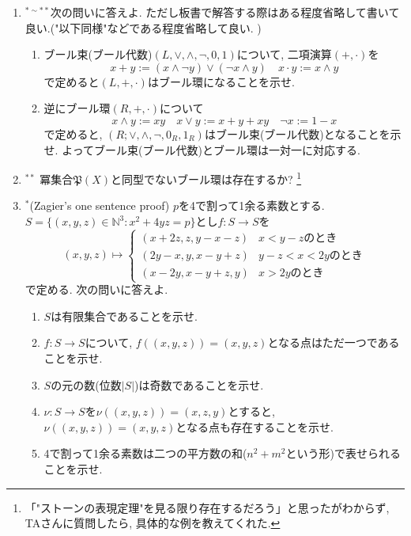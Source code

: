 \documentclass[dvipdfmx,a4paper,11pt]{article}
\theoremstyle{definition}
\begin{document}
\begin{enumerate}[label=\textbf{問}\ref*{sec-1}.\arabic*]
\item $^{* \sim **}$次の問いに答えよ. ただし板書で解答する際はある程度省略して書いて良い.("以下同様"などである程度省略して良い. )
\begin{enumerate}[label=(\arabic*).]
 \setlength{\parskip}{0cm}
  \setlength{\itemsep}{0pt}
  \item ブール束(ブール代数)$ (L, \vee, \wedge, \neg, 0, 1) $について, 二項演算$(+, \cdot)$を
  $$
 x + y := (x\wedge \neg y ) \vee (\neg x \wedge y )
 \quad
 x\cdot y :=x \wedge y
  $$
  で定めると$(L, +, \cdot)$はブール環になることを示せ. %
  \item 逆にブール環$(R, +, \cdot) $について
  $$
  x \wedge y := xy
  \quad
  x \vee y := x + y + xy
  \quad
  \neg x := 1- x
  $$
  で定めると, $ ( R; \vee, \wedge, \neg, 0_R, 1_R)$はブール束(ブール代数)となることを示せ. 
  よってブール束(ブール代数)とブール環は一対一に対応する.

  \end{enumerate}
  \item$^{**}$  冪集合$\mathfrak{P}(X)$と同型でないブール環は存在するか?
  \footnote{「"ストーンの表現定理"を見る限り存在するだろう」と思ったがわからず, TAさんに質問したら, 具体的な例を教えてくれた. }
  
  \newpage
  
  \item $^{*}$(Zagier's one sentence proof)
  $p$を4で割って1余る素数とする. 
 $S = \{ (x, y, z) \in \mathbb{N}^3 : x^2 + 4yz = p \}$とし$f : S \to S$を
\[
(x, y, z) \mapsto 
\begin{cases}
(x + 2z, z, y - x - z) &  x < y - z \text{のとき}\\
(2y - x, y, x - y + z) & y - z < x < 2y \text{のとき}\\
(x - 2y, x - y + z, y) & x > 2y\text{のとき}
\end{cases}
\]
で定める. 次の問いに答えよ. 
\begin{enumerate}[label=(\arabic*).]
 \setlength{\parskip}{0cm}
  \setlength{\itemsep}{0pt}
  \item $S$は有限集合であることを示せ.
  \item $f :S \to S$について, $f((x,y,z))=(x,y,z)$となる点はただ一つであることを示せ.
  \item $S$の元の数(位数$|S|$)は奇数であることを示せ.
  \item $\nu : S \to S$を$\nu((x, y, z)) = (x, z, y)$とすると, $\nu((x,y,z))=(x,y,z)$となる点も存在することを示せ.
  \item 4で割って1余る素数は二つの平方数の和($n^2 + m^2$という形)で表せられることを示せ. 
  \end{enumerate}


\end{enumerate}
\end{document}
